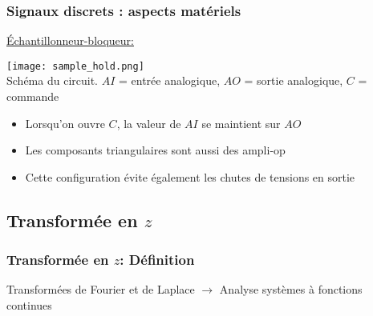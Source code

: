 \documentclass{beamer}
\begin{document}
\begin{frame}
\frametitle{Signaux discrets : aspects matériels}
\underline{\'Echantillonneur-bloqueur:}\\
\begin{center}
\texttt{[image: sample\_hold.png]}\\
\footnotesize{Schéma du circuit. $AI$ = entrée analogique, $AO$ = sortie analogique, $C$ = commande}
\end{center}
\vspace{0.2cm}
\small{
\begin{itemize}
\item Lorsqu'on ouvre $C$, la valeur de $AI$ se maintient sur $AO$
\item Les composants triangulaires sont aussi des ampli-op
\item Cette configuration évite également les chutes de tensions en sortie 
\end{itemize}
}
\end{frame}


\subsection{Transformée en $z$}

\begin{frame}
\frametitle{Transformée en $z$: Définition}
Transformées de Fourier et de Laplace $\rightarrow$ Analyse systèmes à fonctions continues\\

\vspace{0.3 cm}



 \vspace{0.3 cm}


\end{frame} 
\end{document}

